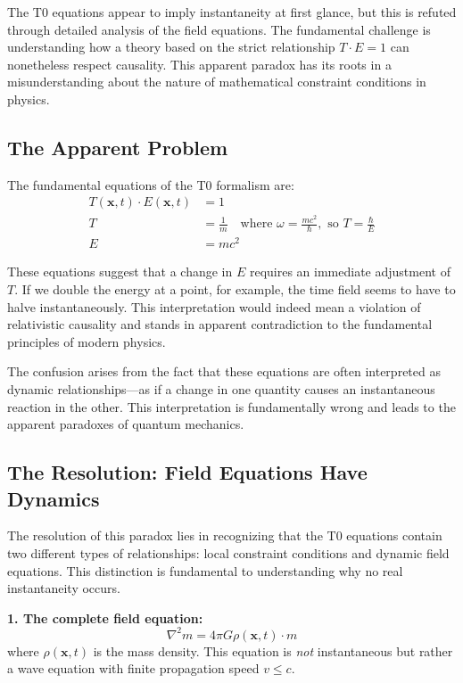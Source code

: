 	The T0 equations appear to imply instantaneity at first glance, but this is refuted through detailed analysis of the field equations. The fundamental challenge is understanding how a theory based on the strict relationship $T \cdot E = 1$ can nonetheless respect causality. This apparent paradox has its roots in a misunderstanding about the nature of mathematical constraint conditions in physics.
	
	\subsection{The Apparent Problem}
	
	The fundamental equations of the T0 formalism are:
	\begin{align}
		T(\mathbf{x},t) \cdot E(\mathbf{x},t) &= 1 \label{eq:TE_constraint} \\
		T &= \frac{1}{m} \quad \text{where } \omega = \frac{mc^2}{\hbar}, \text{ so } T = \frac{\hbar}{E} \label{eq:T_definition} \\
		E &= mc^2 \label{eq:E_definition}
	\end{align}
	
	These equations suggest that a change in $E$ requires an immediate adjustment of $T$. If we double the energy at a point, for example, the time field seems to have to halve instantaneously. This interpretation would indeed mean a violation of relativistic causality and stands in apparent contradiction to the fundamental principles of modern physics.
	
	The confusion arises from the fact that these equations are often interpreted as dynamic relationships—as if a change in one quantity causes an instantaneous reaction in the other. This interpretation is fundamentally wrong and leads to the apparent paradoxes of quantum mechanics.
	
	\subsection{The Resolution: Field Equations Have Dynamics}
	
	The resolution of this paradox lies in recognizing that the T0 equations contain two different types of relationships: local constraint conditions and dynamic field equations. This distinction is fundamental to understanding why no real instantaneity occurs.
	
	\textbf{1. The complete field equation:}
	\begin{equation}
		\nabla^2 m = 4\pi G \rho(\mathbf{x},t) \cdot m \label{eq:field_equation}
	\end{equation}
	where $\rho(\mathbf{x},t)$ is the mass density. This equation is \emph{not} instantaneous but rather a wave equation with finite propagation speed $v \leq c$.
	
